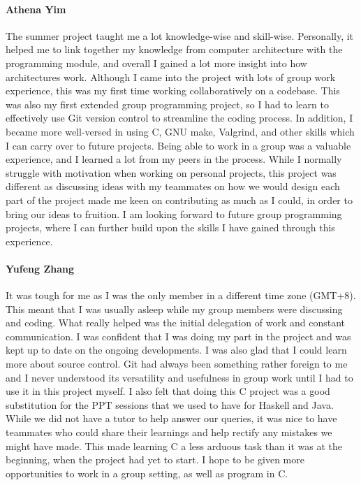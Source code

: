 \documentclass[a4paper,11pt]{article}
\begin{document}
\paragraph{Athena Yim} The summer project taught me a lot knowledge-wise and skill-wise. Personally, it helped me to link together my knowledge from computer architecture with the programming module, and overall I gained a lot more insight into how architectures work. Although I came into the project with lots of group work experience, this was my first time working collaboratively on a codebase. This was also my first extended group programming project, so I had to learn to effectively use Git version control to streamline the coding process. In addition, I became more well-versed in using C, GNU make, Valgrind, and other skills which I can carry over to future projects. Being able to work in a group was a valuable experience, and I learned a lot from my peers in the process. While I normally struggle with motivation when working on personal projects, this project was different as discussing ideas with my teammates on how we would design each part of the project made me keen on contributing as much as I could, in order to bring our ideas to fruition. I am looking forward to future group programming projects, where I can further build upon the skills I have gained through this experience.

\paragraph{Yufeng Zhang} It was tough for me as I was the only member in a different time zone (GMT+8). This meant that I was usually asleep while my group members were discussing and coding. What really helped was the initial delegation of work and constant communication. I was confident that I was doing my part in the project and was kept up to date on the ongoing developments. I was also glad that I could learn more about source control. Git had always been something rather foreign to me and I never understood its versatility and usefulness in group work until I had to use it in this project myself. I also felt that doing this C project was a good substitution for the PPT sessions that we used to have for Haskell and Java. While we did not have a tutor to help answer our queries, it was nice to have teammates who could share their learnings and help rectify any mistakes we might have made. This made learning C a less arduous task than it was at the beginning, when the project had yet to start. I hope to be given more opportunities to work in a group setting, as well as program in C.
\end{document}
